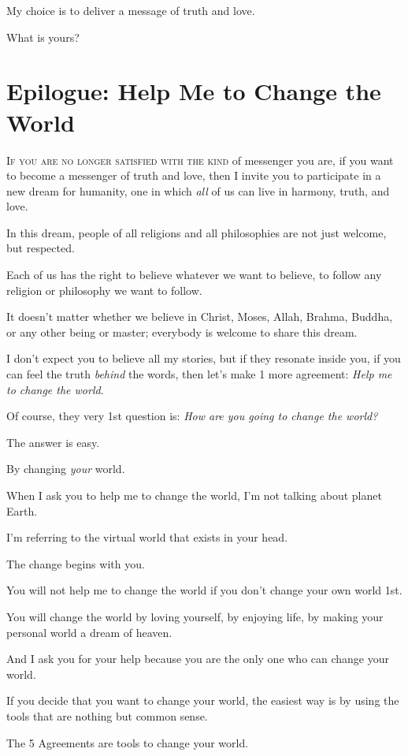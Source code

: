 \documentclass{article}
\numberwithin{equation}{section}
\begin{document}
My choice is to deliver a message of truth and love.

What is yours?

\section{Epilogue: Help Me to Change the World}
\textsc{If you are no longer satisfied with the kind} of messenger you are, if you want to become a messenger of truth and love, then I invite you to participate in a new dream for humanity, one in which \textit{all} of us can live in harmony, truth, and love.

%
In this dream, people of all religions and all philosophies are not just welcome, but respected.

Each of us has the right to believe whatever we want to believe, to follow any religion or philosophy we want to follow.

It doesn't matter whether we believe in Christ, Moses, Allah, Brahma, Buddha, or any other being or master; everybody is welcome to share this dream.

I don't expect you to believe all my stories, but if they resonate inside you, if you can feel the truth \textit{behind} the words, then let's make 1 more agreement: \textit{Help me to change the world}.

%
Of course, they very 1st question is: \textit{How are you going to change the world?}

The answer is easy.

By changing \textit{your} world.

When I ask you to help me to change the world, I'm not talking about planet Earth.

I'm referring to the virtual world that exists in your head.

The change begins with you.

You will not help me to change the world if you don't change your own world 1st.

%
You will change the world by loving yourself, by enjoying life, by making your personal world a dream of heaven.

And I ask you for your help because you are the only one who can change your world.

If you decide that you want to change your world, the easiest way is by using the tools that are nothing but common sense.

The 5 Agreements are tools to change your world.
\end{document}

